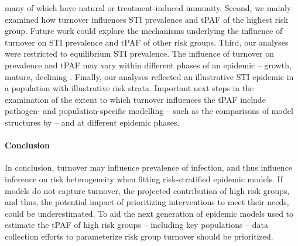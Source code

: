 many of which have natural or treatment-induced immunity.
Second, we mainly examined how turnover influences STI prevalence and tPAF of the highest risk group.
Future work could explore the mechanisms underlying the influence of turnover on
STI prevalence and tPAF of other risk groups.
Third, our analyses were restricted to equilibrium STI prevalence.
The influence of turnover on prevalence and tPAF
may vary within different phases of an epidemic
-- growth, mature, declining \citep{Wasserheit1996}.
Finally, our analyses reflected an illustrative STI epidemic
in a population with illustrative risk strata.
Important next steps in the examination of
the extent to which turnover influences the tPAF include
pathogen- and population-specific modelling
-- such as the comparisons of model structures by \citet{Hontelez2013,Johnson2016} --
and at different epidemic phases.
\paragraph{Conclusion}
In conclusion, turnover may influence prevalence of infection, and
thus influence inference on risk heterogeneity
when fitting risk-stratified epidemic models.
If models do not capture turnover,
the projected contribution of high risk groups, and thus,
the potential impact of prioritizing interventions to meet their needs, could be underestimated.
To aid the next generation of epidemic models
used to estimate the tPAF of high risk groups -- including key populations --
data collection efforts to parameterize risk group turnover should be prioritized.

